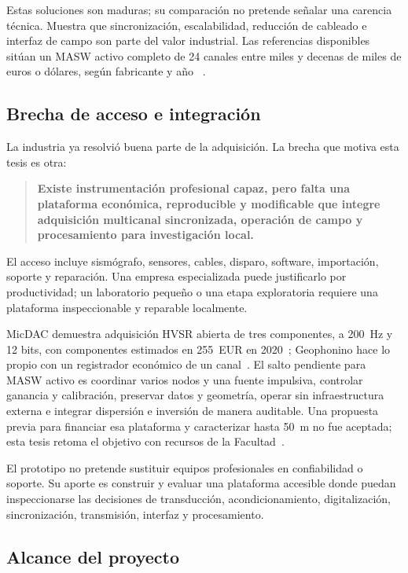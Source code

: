 Estas soluciones son maduras; su comparación no pretende señalar una carencia técnica.
Muestra que sincronización, escalabilidad, reducción de cableado e interfaz de campo son
parte del valor industrial. Las referencias disponibles sitúan un MASW activo completo
de 24 canales entre miles y decenas de miles de euros o dólares, según fabricante y año
~\cite{PASIPrice2022,GeometricsPrice2023,GeoDeviceSummitPrice}.

\subsection{Brecha de acceso e integración}

La industria ya resolvió buena parte de la adquisición. La brecha que motiva esta tesis
es otra:

\begin{quote}
\textbf{Existe instrumentación profesional capaz, pero falta una plataforma económica,
reproducible y modificable que integre adquisición multicanal sincronizada, operación
de campo y procesamiento para investigación local.}
\end{quote}

El acceso incluye sismógrafo, sensores, cables, disparo, software, importación, soporte y
reparación. Una empresa especializada puede justificarlo por productividad; un
laboratorio pequeño o una etapa exploratoria requiere una plataforma inspeccionable y
reparable localmente.

MicDAC demuestra adquisición HVSR abierta de tres componentes, a \SI{200}{\hertz} y 12
bits, con componentes estimados en 255~EUR en 2020~\cite{Kafadar2020}; Geophonino hace
lo propio con un registrador económico de un canal~\cite{Llorens2016}. El salto pendiente
para MASW activo es coordinar varios nodos y una fuente impulsiva, controlar ganancia y
calibración, preservar datos y geometría, operar sin infraestructura externa e integrar
dispersión e inversión de manera auditable. Una propuesta previa para financiar esa
plataforma y caracterizar hasta \SI{50}{\meter} no fue aceptada; esta tesis retoma el
objetivo con recursos de la Facultad~\cite{PINV01317}.

El prototipo no pretende sustituir equipos profesionales en confiabilidad o soporte. Su
aporte es construir y evaluar una plataforma accesible donde puedan inspeccionarse las
decisiones de transducción, acondicionamiento, digitalización, sincronización,
transmisión, interfaz y procesamiento.

\subsection{Alcance del proyecto}

